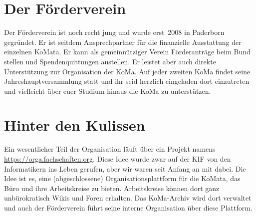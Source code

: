 \section{Der Förderverein}
Der Förderverein ist noch recht jung und wurde erst~2008 in %
Paderborn gegründet. Er ist seitdem Ansprechpartner für die finanzielle
Ausstattung der einzelnen KoMata. Er kann als gemeinnütziger Verein
Förderanträge beim Bund stellen und Spendenquittungen austellen. Er leistet
aber auch direkte Unterstützung zur Organisation der KoMa. Auf jeder zweiten
KoMa findet seine Jahreshauptversammlung statt und ihr seid herzlich eingeladen
dort einzutreten und vielleicht über euer Studium hinaus die KoMa zu
unterstützen.

\section{Hinter den Kulissen}
Ein wesentlicher Teil der Organisation läuft über ein Projekt namens
\url{https://orga.fachschaften.org}. Diese Idee wurde zwar auf der KIF von den
Informatikern ins Leben gerufen, aber wir waren seit Anfang an mit dabei. Die
Idee ist es, eine (abgeschlossene) Organisationsplattform für die KoMata, das
Büro und ihre Arbeitskreise zu bieten. Arbeitskreise können dort ganz
unbürokratisch Wikis und Foren erhalten. Das KoMa-Archiv wird dort verwaltet
und auch der Förderverein führt seine interne Organisation über diese
Plattform.
